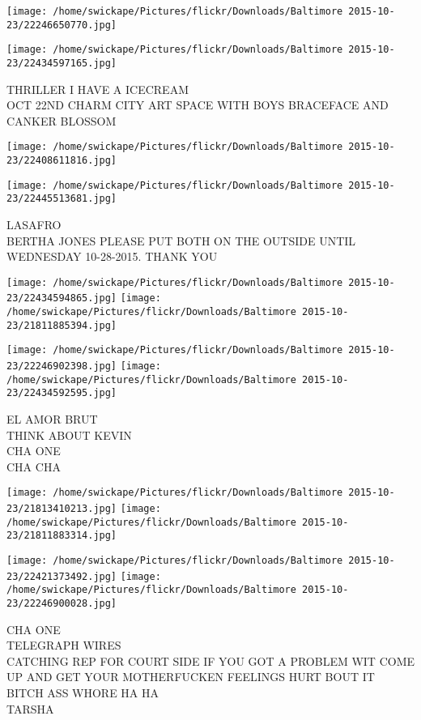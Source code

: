 \documentclass[10pt,letterpaper]{article}
\begin{document}
\texttt{[image: /home/swickape/Pictures/flickr/Downloads/Baltimore 2015-10-23/22246650770.jpg]}

\vspace{0.25in}
\texttt{[image: /home/swickape/Pictures/flickr/Downloads/Baltimore 2015-10-23/22434597165.jpg]}

THRILLER I HAVE A ICECREAM\\
OCT 22ND CHARM CITY ART SPACE WITH BOYS BRACEFACE AND CANKER BLOSSOM\\
\pagebreak

\texttt{[image: /home/swickape/Pictures/flickr/Downloads/Baltimore 2015-10-23/22408611816.jpg]}

\vspace{0.25in}
\texttt{[image: /home/swickape/Pictures/flickr/Downloads/Baltimore 2015-10-23/22445513681.jpg]}

LASAFRO\\
BERTHA JONES PLEASE PUT BOTH ON THE OUTSIDE UNTIL WEDNESDAY 10{-}28{-}2015.  THANK YOU\\
\pagebreak

\texttt{[image: /home/swickape/Pictures/flickr/Downloads/Baltimore 2015-10-23/22434594865.jpg]}
\texttt{[image: /home/swickape/Pictures/flickr/Downloads/Baltimore 2015-10-23/21811885394.jpg]}

\texttt{[image: /home/swickape/Pictures/flickr/Downloads/Baltimore 2015-10-23/22246902398.jpg]}
\texttt{[image: /home/swickape/Pictures/flickr/Downloads/Baltimore 2015-10-23/22434592595.jpg]}

EL AMOR BRUT\\
THINK ABOUT KEVIN\\
CHA ONE\\
CHA CHA\\
\pagebreak

\texttt{[image: /home/swickape/Pictures/flickr/Downloads/Baltimore 2015-10-23/21813410213.jpg]}
\texttt{[image: /home/swickape/Pictures/flickr/Downloads/Baltimore 2015-10-23/21811883314.jpg]}

\texttt{[image: /home/swickape/Pictures/flickr/Downloads/Baltimore 2015-10-23/22421373492.jpg]}
\texttt{[image: /home/swickape/Pictures/flickr/Downloads/Baltimore 2015-10-23/22246900028.jpg]}

CHA ONE\\
TELEGRAPH WIRES\\
CATCHING REP FOR COURT SIDE IF YOU GOT A PROBLEM WIT COME UP AND GET YOUR MOTHERFUCKEN FEELINGS HURT BOUT IT BITCH ASS WHORE HA HA\\
TARSHA\\
\pagebreak
\end{document}
